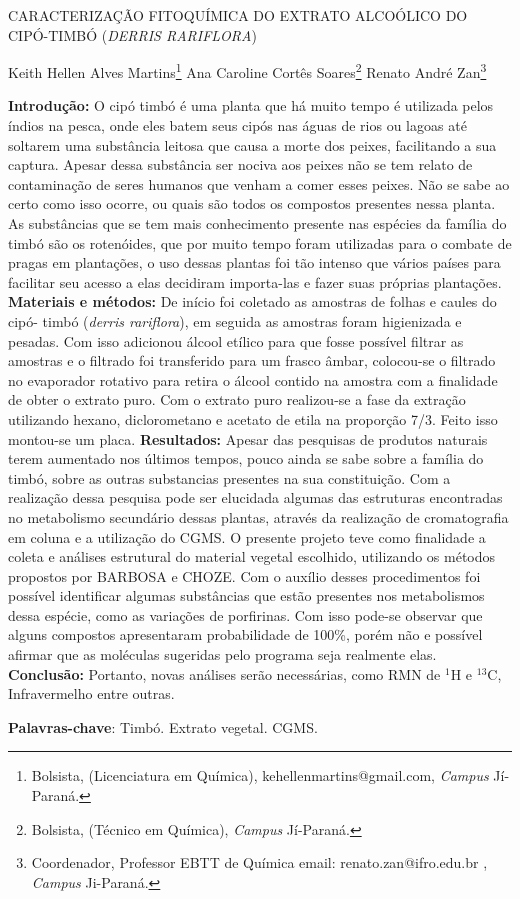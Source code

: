 \documentclass[article,12pt,onesidea,4paper,english,brazil]{abntex2}
\begin{document}
	
	
	\frenchspacing 
	
	\begin{center}
		\LARGE CARACTERIZAÇÃO FITOQUÍMICA DO EXTRATO ALCOÓLICO DO CIPÓ-TIMBÓ (\textit{DERRIS RARIFLORA})
		
		\normalsize
		Keith Hellen Alves Martins\footnote{Bolsista, (Licenciatura em Química), kehellenmartins@gmail.com, \textit{Campus} Jí-Paraná.} 
		Ana Caroline Cortês Soares\footnote{Bolsista, (Técnico em Química), \textit{Campus} Jí-Paraná.} 
		Renato André Zan\footnote{Coordenador, Professor EBTT de Química email: renato.zan@ifro.edu.br , \textit{Campus} Ji-Paraná.} 
	\end{center}
	
	\noindent \textbf{Introdução:} O cipó timbó é uma planta que há muito tempo é utilizada pelos índios na pesca, onde eles batem seus cipós nas águas de rios ou lagoas até soltarem
	uma substância leitosa que causa a morte dos peixes, facilitando a sua captura.
	Apesar dessa substância ser nociva aos peixes não se tem relato de contaminação
	de seres humanos que venham a comer esses peixes. Não se sabe ao certo como
	isso ocorre, ou quais são todos os compostos presentes nessa planta. As
	substâncias que se tem mais conhecimento presente nas espécies da família do
	timbó são os rotenóides, que por muito tempo foram utilizadas para o combate de
	pragas em plantações, o uso dessas plantas foi tão intenso que vários países para
	facilitar seu acesso a elas decidiram importa-las e fazer suas próprias plantações.
	\textbf{Materiais e métodos:} De início foi coletado as amostras de folhas e caules do cipó-
	timbó (\textit{derris rariflora}), em seguida as amostras foram higienizada e pesadas. Com
	isso adicionou álcool etílico para que fosse possível filtrar as amostras e o filtrado foi
	transferido para um frasco âmbar, colocou-se o filtrado no evaporador rotativo para
	retira o álcool contido na amostra com a finalidade de obter o extrato puro. Com o
	extrato puro realizou-se a fase da extração utilizando hexano, diclorometano e
	acetato de etila na proporção 7/3. Feito isso montou-se um placa. \textbf{Resultados:}
	Apesar das pesquisas de produtos naturais terem aumentado nos últimos tempos,
	pouco ainda se sabe sobre a família do timbó, sobre as outras substancias
	presentes na sua constituição. Com a realização dessa pesquisa pode ser elucidada
	algumas das estruturas encontradas no metabolismo secundário dessas plantas,
	através da realização de cromatografia em coluna e a utilização do CGMS. O
	presente projeto teve como finalidade a coleta e análises estrutural do material
	vegetal escolhido, utilizando os métodos propostos por BARBOSA e CHOZE. Com o
	auxílio desses procedimentos foi possível identificar algumas substâncias que estão
	presentes nos metabolismos dessa espécie, como as variações de porfirinas. Com
	isso pode-se observar que alguns compostos apresentaram probabilidade de 100\%,
	porém não e possível afirmar que as moléculas sugeridas pelo programa seja
	realmente elas. \textbf{Conclusão:} Portanto, novas análises serão necessárias, como RMN
	de $^{1}$H e $^{13}$C, Infravermelho entre outras.
	
	\vspace{\onelineskip}
	
	\noindent
	\textbf{Palavras-chave}: Timbó. Extrato vegetal. CGMS.
	
\end{document}
